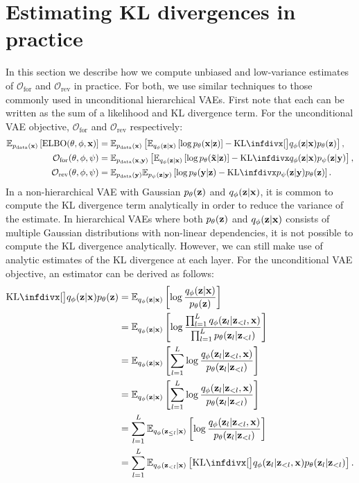\section{Estimating KL divergences in practice} \label{supp:cigcvae-kl-estimates}
In this section we describe how we compute unbiased and low-variance estimates
of $\mathcal{O}_\mathrm{for}$ and $\mathcal{O}_\text{rev}$ in practice. For
both, we use similar techniques to those commonly used in unconditional
hierarchical VAEs. First note that each can be written as the sum of a
likelihood and KL divergence term. For the unconditional VAE objective,
$\mathcal{O}_\mathrm{for}$ and $\mathcal{O}_\text{rev}$ respectively:
\begin{align}
  \EX_{\pdata (\rvx)} \left[ \text{ELBO}(\theta, \phi, \rvx) \right] &= \EX_{\pdata (\rvx)}\left[ \EX_{q_\phi(\rvz|\rvx)} \left[ \log p_\theta(\rvx|\rvz)  \right] - \kl[\big]{q_\phi(\rvz|\rvx)}{p_\theta(\rvz)}  \right], \\
  \mathcal{O}_\mathrm{for}(\theta, \phi, \psi ) &= \EX_{\pdata (\rvx, \rvy)} \left[ \EX_{q_\phi(\rvz|\rvx)} \left[ \log p_\theta(\tildeI{}|\rvz) \right] - \kl{q_\phi(\rvz|\rvx)}{p_\psi(\rvz|\rvy)} \right], \\
  \mathcal{O}_\text{rev}(\theta, \phi, \psi ) &= \EX_{\pdata (\rvy)}\EX_{p_\psi(\rvz|\rvy)} \left[ \log p_\theta(\rvy|\rvz) - \kl{p_\psi(\rvz|\rvy)}{p_\theta(\rvz)} \right].
\end{align}
In a non-hierarchical VAE with Gaussian $p_\theta({\mathbf{z}})$ and $q_\phi({\mathbf{z}}|{\mathbf{x}})$, it is
common to compute the KL divergence term analytically in order to reduce the
variance of the estimate. In hierarchical VAEs where both $p_\theta({\mathbf{z}})$ and
$q_\phi({\mathbf{z}}|{\mathbf{x}})$ consists of multiple Gaussian distributions with non-linear
dependencies, it is not possible to compute the KL divergence analytically.
However, we can still make use of analytic estimates of the KL divergence at
each layer. For the unconditional VAE objective, an estimator can be derived as
follows:
\begin{align}
  \kl[\big]{q_\phi(\rvz|\rvx)}{p_\theta(\rvz)} &= \EX_{q_\phi(\rvz|\rvx)} \left[ \log \frac{q_\phi(\rvz|\rvx)}{p_\theta(\rvz)} \right] \\
                                     &= \EX_{q_\phi(\rvz|\rvx)} \left[ \log \frac{\prod_{l=1}^L q_\phi(\rvz_l|\rvz_{<l}, \rvx)}{\prod_{l=1}^L p_\theta(\rvz_l|\rvz_{<l})} \right] \\
                                     &= \EX_{q_\phi(\rvz|\rvx)} \left[ \sum_{l=1}^L \log \frac{q_\phi(\rvz_l|\rvz_{<l}, \rvx)}{p_\theta(\rvz_l|\rvz_{<l})} \right] \\
                                     &= \EX_{q_\phi(\rvz|\rvx)} \left[ \sum_{l=1}^L \log \frac{q_\phi(\rvz_l|\rvz_{<l}, \rvx)}{p_\theta(\rvz_l|\rvz_{<l})} \right] \\
                                     &= \sum_{l=1}^L \EX_{q_\phi(\rvz_{\leq l}|\rvx)} \left[ \log \frac{q_\phi(\rvz_l|\rvz_{<l}, \rvx)}{p_\theta(\rvz_l|\rvz_{<l})} \right] \\
                                     &= \sum_{l=1}^L \EX_{q_\phi(\rvz_{<l}|\rvx)} \left[ \kl[\big]{q_\phi(\rvz_l|\rvz_{<l}, \rvx)}{p_\theta(\rvz_l|\rvz_{<l})} \right].
\end{align}
